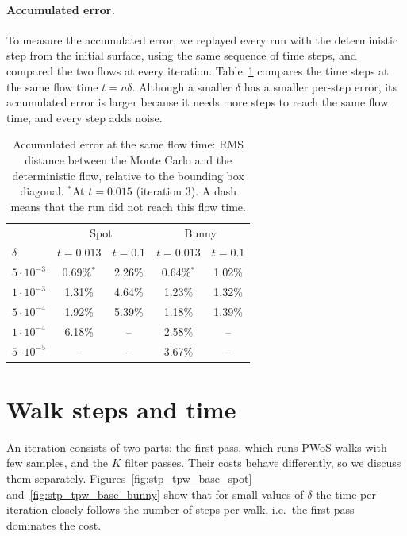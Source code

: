 \documentclass[
]{elteiktdk}[2024/04/26]
\begin{document}
	\paragraph{Accumulated error.} To measure the accumulated error, we replayed every run with the deterministic step from the initial surface, using the same sequence of time steps, and compared the two flows at every iteration. Table~\ref{tab:global_delta} compares the time steps at the same flow time $t = n\delta$. Although a smaller $\delta$ has a smaller per-step error, its accumulated error is larger because it needs more steps to reach the same flow time, and every step adds noise.
	
	\begin{table}[H]
		\centering
		\begin{tabular}{l c c c c}
			\hline
			& \multicolumn{2}{c}{Spot} & \multicolumn{2}{c}{Bunny} \\
			$\delta$ & $t = 0.013$ & $t = 0.1$ & $t = 0.013$ & $t = 0.1$ \\
			\hline
			$5\cdot10^{-3}$ & 0.69\%$^*$ & 2.26\% & 0.64\%$^*$ & 1.02\% \\
			$1\cdot10^{-3}$ & 1.31\% & 4.64\% & 1.23\% & 1.32\% \\
			$5\cdot10^{-4}$ & 1.92\% & 5.39\% & 1.18\% & 1.39\% \\
			$1\cdot10^{-4}$ & 6.18\% & --     & 2.58\% & --     \\
			$5\cdot10^{-5}$ & --     & --     & 3.67\% & --     \\
			\hline
		\end{tabular}
		\caption{Accumulated error at the same flow time: RMS distance between the Monte Carlo and the deterministic flow, relative to the bounding box diagonal. $^*$At $t = 0.015$ (iteration 3). A dash means that the run did not reach this flow time.}
		\label{tab:global_delta}
	\end{table}
	
	\section{Walk steps and time}
	\label{wpsNtpw}
	
	An iteration consists of two parts: the first pass, which runs PWoS walks with few samples, and the $K$ filter passes. Their costs behave differently, so we discuss them separately. Figures~\ref{fig:stp_tpw_base_spot} and~\ref{fig:stp_tpw_base_bunny} show that for small values of $\delta$ the time per iteration closely follows the number of steps per walk, i.e.\ the first pass dominates the cost.  
	
\end{document}
